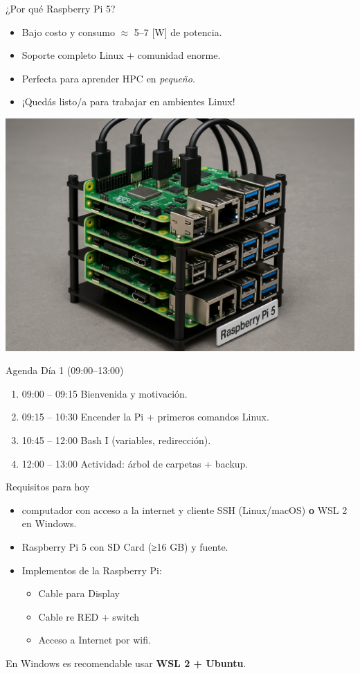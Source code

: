 \documentclass[aspectratio=169,professionalfonts]{beamer}
\begin{document}
\begin{frame}{¿Por qué Raspberry Pi 5?}
  \begin{itemize}
    \item Bajo costo y consumo $\approx$ 5--7 [W] de potencia.
    \item Soporte completo Linux + comunidad enorme.
    \item Perfecta para aprender HPC en \textit{pequeño}.
    \item ¡Quedás listo/a para trabajar en ambientes Linux! 
  \end{itemize}
  \vspace{0.4em}
  \centering
  \includegraphics[width=0.5\linewidth]{rpi5-cluster.png} %
\end{frame}

\begin{frame}{Agenda Día 1 (09:00--13:00)}
  \begin{enumerate}
    \item 09:00 -- 09:15  Bienvenida y motivación.
    \item 09:15 -- 10:30  Encender la Pi + primeros comandos Linux.
    \item 10:45 -- 12:00  Bash I (variables, redirección).
    \item 12:00 -- 13:00  Actividad: árbol de carpetas + backup.
  \end{enumerate}
\end{frame}

\begin{frame}[fragile]{Requisitos para hoy}
  \begin{itemize}
    \item computador con acceso a la internet y cliente SSH (Linux/macOS) \textbf{o} WSL 2 en Windows.
    \item Raspberry Pi 5 con SD Card (≥16 GB) y fuente.
    \item Implementos de la Raspberry Pi:
    \begin{itemize}
      \item Cable para Display
      \item Cable re RED + switch
      \item Acceso a Internet por wifi.
    \end{itemize}
  \end{itemize}
  \alert{En Windows es recomendable usar \textbf{WSL 2 + Ubuntu}.}
\end{frame}
\end{document}

